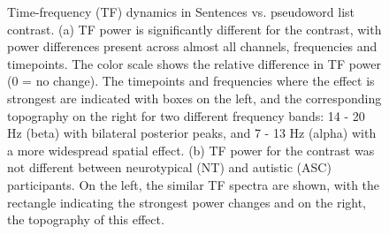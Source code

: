 \begin{figure}[!ht]
	\centering
	\caption{Time-frequency (TF) dynamics in Sentences vs. pseudoword list contrast. (a) TF power is significantly different for the contrast, with power differences present across almost all channels, frequencies and timepoints. The color scale shows the relative difference in TF power (0 = no change). The timepoints and frequencies where the effect is strongest are indicated with boxes on the left, and the corresponding topography on the right for two different frequency bands: 14 - 20 Hz (beta) with bilateral posterior peaks, and 7 - 13 Hz (alpha) with a more widespread spatial effect. (b) TF power for the contrast was not different between neurotypical (NT) and autistic (ASC) participants. On the left, the similar TF spectra are shown, with the rectangle indicating the strongest power changes and on the right, the topography of this effect. }
    \vspace*{-10pt}
	\label{fig:tf-spectrum-full}
\end{figure}


